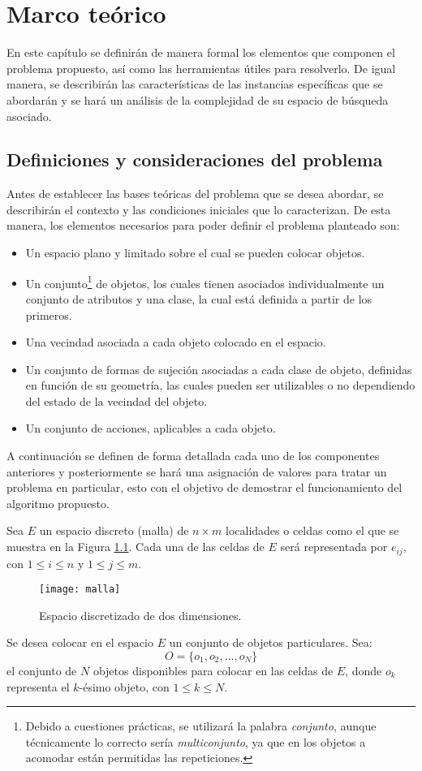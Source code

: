 \chapter{Marco teórico}
\label{chap:marco_teorico}
%
%
En este capítulo se definirán de manera formal los elementos que componen el problema propuesto, así como las herramientas útiles para resolverlo.
De igual manera, se describirán las características de las instancias específicas que se abordarán y se hará un análisis de la complejidad de su espacio de búsqueda asociado.
%
%
\section{Definiciones y consideraciones del problema}
\label{sec:definiciones_y_consideraciones}
%
%
Antes de establecer las bases teóricas del problema que se desea abordar, se describirán el contexto y las condiciones iniciales que lo caracterizan.
De esta manera, los elementos necesarios para poder definir el problema planteado son: 
%
\begin{itemize}
	\item Un espacio plano y limitado sobre el cual se pueden colocar objetos.
	\item Un conjunto\footnote{Debido a cuestiones prácticas, se utilizará la palabra \textsl{conjunto}, aunque técnicamente lo correcto sería \textsl{multiconjunto}, ya que en los objetos a acomodar están permitidas las repeticiones.} de objetos, los cuales tienen asociados individualmente un conjunto de atributos y una clase, la cual está definida a partir de los primeros.
	\item Una vecindad asociada a cada objeto colocado en el espacio.
	\item Un conjunto de formas de sujeción asociadas a cada clase de objeto, definidas en función de su geometría, las cuales pueden ser utilizables o no dependiendo del estado de la vecindad del objeto.
	\item Un conjunto de acciones, aplicables a cada objeto.
\end{itemize}
%
A continuación se definen de forma detallada cada uno de los componentes anteriores y posteriormente se hará una asignación de valores para tratar un problema en particular, esto con el objetivo de demostrar el funcionamiento del algoritmo propuesto.

Sea $E$ un espacio discreto (malla) de $n\times m$ localidades o celdas como el que se muestra en la Figura \ref{fig:malla}.
Cada una de las celdas de $E$ será representada por $e_{ij}$, con $1 \leq i \leq n$ y $1 \leq j \leq m$.
%
\begin{figure}[H]
	\texttt{[image: malla]}%
	\caption{Espacio discretizado de dos dimensiones.}%
	\label{fig:malla}%
\end{figure}
%
Se desea colocar en el espacio $E$ un conjunto de objetos particulares.
Sea:
%
\begin{equation}
\label{eq:objetos}
O = \{ o_1, o_2, \ldots, o_N \}
\end{equation}
%
el conjunto de $N$ objetos disponibles para colocar en las celdas de $E$, donde $o_k$ representa el $k$-ésimo objeto, con $1 \leq k \leq N$.

